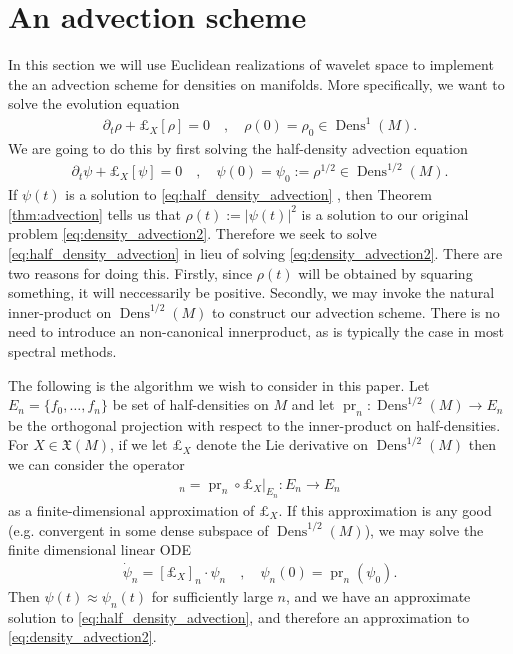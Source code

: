 \documentclass[letterpaper, 12 pt]{amsart}
\DeclareMathOperator{\Dens}{Dens}
\DeclareMathOperator{\pr}{pr}
\begin{document}


\section{An advection scheme}
\label{sec:scheme}
   In this section we will use Euclidean realizations of wavelet space
   to implement the an advection scheme for densities on manifolds.
   More specifically, we want to solve the evolution equation
   \begin{align}
     \partial_t \rho + \pounds_X[\rho] = 0 \quad , \quad 
     \rho(0) = \rho_0 \in \Dens^1(M). \label{eq:density_advection2}
   \end{align}
   We are going to do this by first solving the half-density advection
   equation
   \begin{align}
     \partial_t \psi + \pounds_X[\psi] = 0 \quad , \quad
     \psi(0) = \psi_0 := \rho^{1/2} \in \Dens^{1/2}(M). \label{eq:half_density_advection}
   \end{align}
   If $\psi(t)$ is a solution to \eqref{eq:half_density_advection}
   , then Theorem \ref{thm:advection} tells us that $\rho(t) := |\psi(t)|^2$
   is a solution to our original problem \eqref{eq:density_advection2}.
   Therefore we seek to solve \eqref{eq:half_density_advection}
   in lieu of solving \eqref{eq:density_advection2}.
   There are two reasons for doing this.
   Firstly, since $\rho(t)$ will be obtained by squaring something,
   it will neccessarily be positive.
   Secondly, we may invoke the natural inner-product on $\Dens^{1/2}(M)$
   to construct our advection scheme.
   There is no need to introduce an non-canonical innerproduct, as is
   typically the case in most spectral methods.
   
   The following is the algorithm we wish to consider in this paper.
   Let $E_n = \{ f_0, \dots, f_n \}$ be set of half-densities on $M$
   and let $\pr_n : \Dens^{1/2}(M) \to E_n$ be the orthogonal projection
   with respect to the inner-product on half-densities.
   For $X \in \mathfrak{X}(M)$, if we let $\pounds_X$ denote the Lie 
   derivative on $\Dens^{1/2}(M)$ then we can consider the operator
   \begin{align*}
     [\pounds_X]_n = \pr_n \circ \left. \pounds_X \right|_{E_n} : 
     E_n \to E_n
   \end{align*}
   as a finite-dimensional approximation of $\pounds_X$.
   If this approximation is any good (e.g. convergent in some dense 
   subspace of $\Dens^{1/2}(M)$), we may solve the finite dimensional
   linear ODE
   \begin{align*}
     \dot{\psi}_n = [\pounds_X]_n \cdot \psi_n \quad , \quad
     \psi_n(0) = \pr_n( \psi_0 ).
   \end{align*}
   Then $\psi(t) \approx \psi_n(t)$ for sufficiently large $n$,
   and we have an approximate solution to \eqref{eq:half_density_advection},
   and therefore an approximation to \eqref{eq:density_advection2}.
\end{document}
